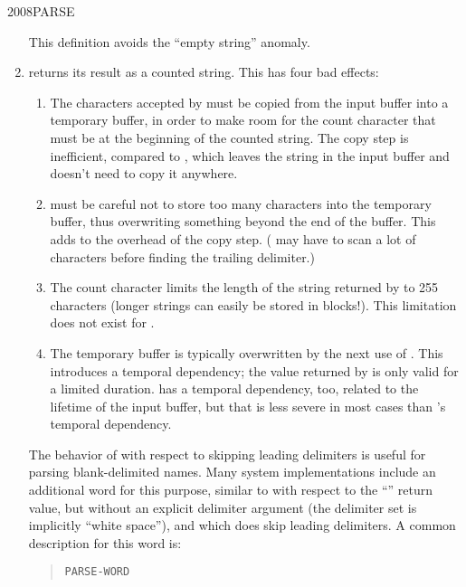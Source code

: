 \begin{worddef}{2008}{PARSE}
\begin{rationale}
\begin{enumerate}
			This definition avoids the ``empty string'' anomaly.

		\item {} returns its result as a counted string.
			This has four bad effects:

			\begin{enumerate}
			\item The characters accepted by  must be
				copied from the input buffer into a temporary buffer,
				in order to make room for the count character that
				must be at the beginning of the counted string. The
				copy step is inefficient, compared to ,
				which leaves the string in the input buffer and doesn't
				need to copy it anywhere.

			\item {} must be careful not to store too many
				characters into the temporary buffer, thus overwriting
				something beyond the end of the buffer. This adds to
				the overhead of the copy step. ( may have
				to scan a lot of characters before finding the trailing
				delimiter.)

			\item The count character limits the length of the string
				returned by  to 255 characters (longer
				strings can easily be stored in blocks!). This
				limitation does not exist for .

			\item The temporary buffer is typically overwritten by the
				next use of . This introduces a temporal
				dependency; the value returned by  is only
				valid for a limited duration.  has a
				temporal dependency, too, related to the lifetime of
				the input buffer, but that is less severe in most
				cases than 's temporal dependency.
			\end{enumerate}

			The behavior of  with respect to skipping
			leading delimiters is useful for parsing blank-delimited
			names. Many system implementations include an additional
			word for this purpose, similar to  with respect
			to the ``'' return value, but without an
			explicit delimiter argument (the delimiter set is implicitly
			``white space''), and which does skip leading delimiters. A
			common description for this word is:

			\begin{quote}
				\texttt{PARSE-WORD} \qquad
					 \\


\end{quote}
\end{enumerate}
\end{rationale}
\end{worddef}
